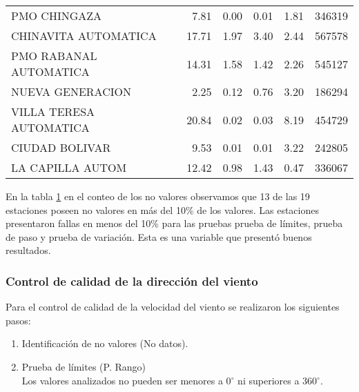 \begin{table}[H]
\begin{center}
\begin{tabular}{p{3cm}rrrrr}
            PMO CHINGAZA &       7.81 &      0.00 &           0.01 &          1.81 &        346319 \\
    CHINAVITA AUTOMATICA &      17.71 &      1.97 &           3.40 &          2.44 &        567578 \\
  PMO RABANAL AUTOMATICA &      14.31 &      1.58 &           1.42 &          2.26 &        545127 \\
        NUEVA GENERACION &       2.25 &      0.12 &           0.76 &          3.20 &        186294 \\
 VILLA TERESA AUTOMATICA &      20.84 &      0.02 &           0.03 &          8.19 &        454729 \\
          CIUDAD BOLIVAR &       9.53 &      0.01 &           0.01 &          3.22 &        242805 \\
        LA CAPILLA AUTOM &      12.42 &      0.98 &           1.43 &          0.47 &        336067 \\
\bottomrule
\end{tabular}		
		\label{tabla:val_vel_viento}
\end{center}
\end{table}

En la tabla \ref{tabla:val_vel_viento} en el conteo de los no valores observamos que 13 de las 19 estaciones poseen no valores en más del 10\% de los valores. Las estaciones presentaron fallas en menos del 10\% para las pruebas prueba de límites, prueba de paso y prueba de variación. Esta es una variable que presentó buenos resultados.

\subsubsection{Control de calidad de la dirección del viento}

Para el control de calidad de la velocidad del viento se realizaron los siguientes pasos:

\begin{enumerate}
\item Identificación de no valores (No datos).\\

\item Prueba de límites (P. Rango)\\
Los valores analizados no pueden ser menores a 0$^{\circ}$ ni superiores a 360$^{\circ}$.
\end{enumerate}

